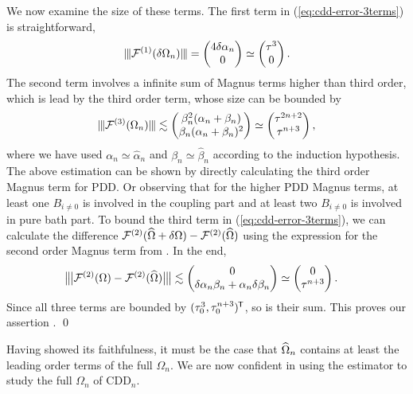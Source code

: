 \documentclass[b5paper,11pt]{article}
\begin{document}
We now examine the size of these terms.
The first term in (\ref{eq:cdd-error-3terms}) is straightforward,
\begin{equation*}
\opnorm{\cF\up{1}(\delta\Omega_{n})} = \begin{pmatrix}
4 \delta\alpha_{n} \\
0
\end{pmatrix}\simeq
\begin{pmatrix}
\tau^3 \\
0
\end{pmatrix}.
\end{equation*}
The second term involves a infinite sum of Magnus terms higher than third order, which is lead by the third order term, whose 
size can be bounded by 
\begin{equation*}
\opnorm{\cF\up{3}(\Omega_n)}\lesssim
\begin{pmatrix}
\beta_{n}^2 (\alpha_{n}+\beta_{n}) \\
\beta_{n} (\alpha_{n}+\beta_{n})^2
\end{pmatrix}
\simeq \begin{pmatrix}
\tau^{2n+2}\\
\tau^{n+3}
\end{pmatrix},
\end{equation*}
where we have used $\alpha_{n}\simeq\widehat\alpha_{n}$ and $\beta_{n}\simeq\widehat\beta_{n}$ according to the induction hypothesis.
The above estimation can be shown by directly calculating the third order Magnus term for PDD. Or observing that for the higher PDD Magnus terms, 
at least one $B_{i\neq0}$ is involved in the coupling part and at least two $B_{i\neq 0}$ is involved in pure bath part.  
To bound the third term in (\ref{eq:cdd-error-3terms}), we can calculate the difference $\mathcal{F}^{(2)}(\widehat{\Omega}+\delta\Omega) - \mathcal{F}^{(2)}(\widehat{\Omega})$
using the expression for the second order Magnus term from .  In the end,
\begin{equation*}
\begin{split}
&\opnorm[\big]{\cF\up{2}(\Omega) - \cF\up{2}(\Ohat)} 
\lesssim\begin{pmatrix}
    0\\
    \delta\alpha_{n} \beta_{n} +\alpha_{n} \delta\beta_{n}
\end{pmatrix}\simeq
\begin{pmatrix}
    0\\
    \tau^{n+3}
\end{pmatrix}.
\end{split}
\end{equation*}
Since all three terms are bounded by $(\tau_0^3, \tau_0^{n+3})^{\mkern-1.5mu\mathsf{T}}$, so is their sum. This proves our assertion . \qed

\smallskip

Having showed its faithfulness, it must be the case that $\widehat{\Omega}_n$ contains at least the leading order terms of the full $\Omega_n$. We are now confident in using the estimator  to study the full $\Omega_{n}$ of $\mathrm{CDD}_n$. 


\end{document}

